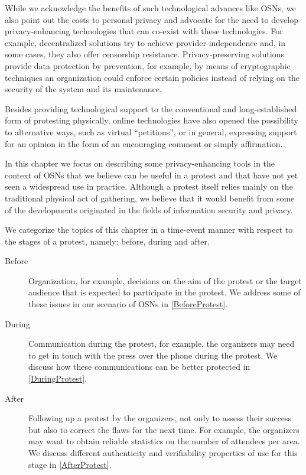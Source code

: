 While we acknowledge the benefits of such technological advances like
\acp{OSN}, we also point out the costs to personal privacy and
advocate for the need to develop privacy-enhancing technologies that
can co-exist with these technologies. For example, decentralized
solutions try to achieve provider independence and, in some cases,
they also offer censorship resistance. Privacy-preserving solutions
provide data protection by prevention, for example, by means of
cryptographic techniques an organization could enforce certain
policies instead of relying on the security of the system and its
maintenance.

Besides providing technological support to the conventional and
long-established form of protesting physically, online technologies
have also opened the possibility to alternative ways, such as virtual
\enquote{petitions}, or in general, expressing support for an opinion
in the form of an encouraging comment or simply affirmation.


In this chapter we focus on describing some privacy-enhancing tools in
the context of \acp{OSN} that we believe can be useful in a protest
and that have not yet seen a widespread use in practice. Although a
protest itself relies mainly on the traditional physical act of
gathering, we believe that it would benefit from some of the
developments originated in the fields of information security and
privacy.

We categorize the topics of this chapter in a time-event manner with respect to the 
stages of a protest, namely: before, during and after.
\begin{description}
  \item[Before]
    Organization, for example, decisions on the aim of the protest or the 
    target audience that is expected to participate in the protest.
    We address some of these issues in our scenario of \acp{OSN} in \cref{BeforeProtest}.

  \item[During]
    Communication during the protest, for example, the organizers may need to 
    get in touch with the press over the phone during the protest.
    We discuss how these communications can be better protected in \cref{DuringProtest}.

  \item[After]
    Following up a protest by the organizers, not only to assess their success 
    but also to correct the flaws for the next time.  For example, the 
    organizers may want to obtain reliable statistics on the number of 
    attendees per area.
    We discuss different authenticity and verifiability properties of use for this 
    stage in \cref{AfterProtest}.
\end{description}


